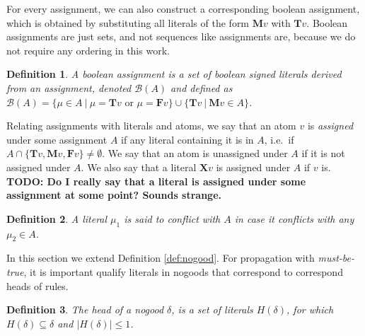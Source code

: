 \documentclass{vutinfth} %
\newcommand{\todo}[1]{{\color{red}\textbf{TODO: {#1}}}} %
\newtheorem{definition}{Definition}[section]
\newcommand{\mbt}{must-be-true\xspace}
\newcommand{\bass}{\mathcal{B}}
\newcommand{\ass}{A}
\newcommand{\bT}{\mathbf{T}}
\newcommand{\bM}{\mathbf{M}}
\newcommand{\bF}{\mathbf{F}}
\newcommand{\bX}{\mathbf{X}}
\newcommand{\headf}{H}
\newcommand{\sgl}{\mu}
\begin{document}

For every assignment, we can also construct a corresponding boolean assignment, which is obtained by substituting all literals of the form $\bM v$ with $\bT v$. Boolean assignments are just sets, and not sequences like assignments are, because we do not require any ordering in this work.

\begin{definition}
A \emph{boolean assignment} is a set of boolean signed literals derived from an assignment, denoted $\bass(\ass)$ and defined as $\bass(\ass) = \{ \sgl \in \ass \ | \ \sgl = \bT v \textrm{ or } \sgl = \bF v \} \cup \{ \bT v \ | \ \bM v \in \ass \}$.
\end{definition}

Relating assignments with literals and atoms, we say that an atom $v$ is \emph{assigned} under some assignment $\ass$ if any literal containing it is in $\ass$, i.e.~if $\ass \cap \{\bT v, \bM v, \bF v \} \not = \emptyset$. We say that an atom is unassigned under $A$ if it is not assigned under $A$. We also say that a literal $\bX v$ is assigned under $\ass$ if $v$ is. \todo{Do I really say that a literal is assigned under some assignment at some point? Sounds strange.}




\begin{definition}
A literal $\sgl_1$ is said to conflict with $\ass$ in case it conflicts with any $\sgl_2 \in \ass$.
\end{definition}

In this section we extend Definition \ref{def:nogood}. For propagation with \emph{\mbt}, it is important qualify literals in nogoods that correspond to correspond heads of rules.

\begin{definition}
The \emph{head} of a nogood $\delta$, is a set of literals $\headf(\delta)$, for which $\headf(\delta) \subseteq \delta$ and $|\headf(\delta)| \leq 1$.\end{definition}
\end{document}
